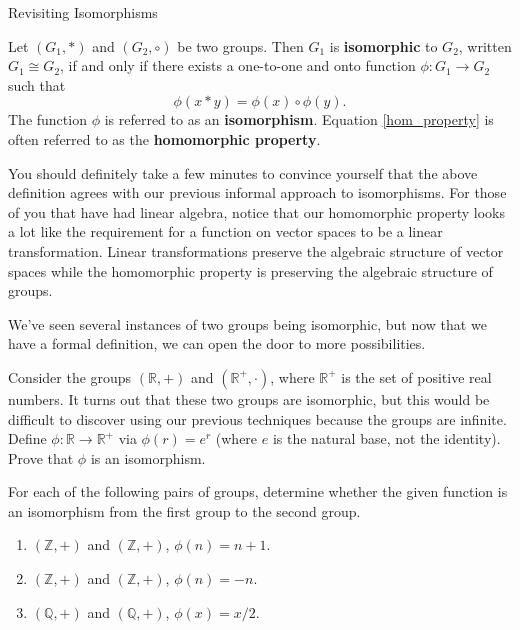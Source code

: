\begin{section}{Revisiting Isomorphisms}
\begin{definition}\label{def:iso}
Let $(G_1,*)$ and $(G_2,\circ)$ be two groups.  Then $G_1$ is \textbf{isomorphic} to $G_2$, written $G_1\cong G_2$, if and only if there exists a one-to-one and onto function $\phi:G_1\to G_2$ such that
\begin{equation}\label{hom_property}
\phi(x*y)=\phi(x)\circ \phi(y).
\end{equation}
The function $\phi$ is referred to as an \textbf{isomorphism}.  Equation \ref{hom_property} is often referred to as the \textbf{homomorphic property}.
\end{definition}

You should definitely take a few minutes to convince yourself that the above definition agrees with our previous informal approach to isomorphisms.  For those of you that have had linear algebra, notice that our homomorphic property looks a lot like the requirement for a function on vector spaces to be a linear transformation.  Linear transformations preserve the algebraic structure of vector spaces while the homomorphic property is preserving the algebraic structure of groups.

We've seen several instances of two groups being isomorphic, but now that we have a formal definition, we can open the door to more possibilities.

\begin{problem}
Consider the groups $(\mathbb{R},+)$ and $(\mathbb{R}^+,\cdot)$, where $\mathbb{R}^+$ is the set of positive real numbers.  It turns out that these two groups are isomorphic, but this would be difficult to discover using our previous techniques because the groups are infinite.  Define $\phi:\mathbb{R}\to \mathbb{R}^+$ via $\phi(r)=e^r$ (where $e$ is the natural base, not the identity). Prove that $\phi$ is an isomorphism.
\end{problem}

\begin{exercise}
For each of the following pairs of groups, determine whether the given function is an isomorphism from the first group to the second group.
\begin{enumerate}[label=\rm{(\alph*)}]
\item $(\mathbb{Z},+)$ and $(\mathbb{Z},+)$, $\phi(n)=n+1$.
\item $(\mathbb{Z},+)$ and $(\mathbb{Z},+)$, $\phi(n)=-n$.
\item $(\mathbb{Q},+)$ and $(\mathbb{Q},+)$, $\phi(x)=x/2$.
\end{enumerate}


\end{exercise}
\end{section}
